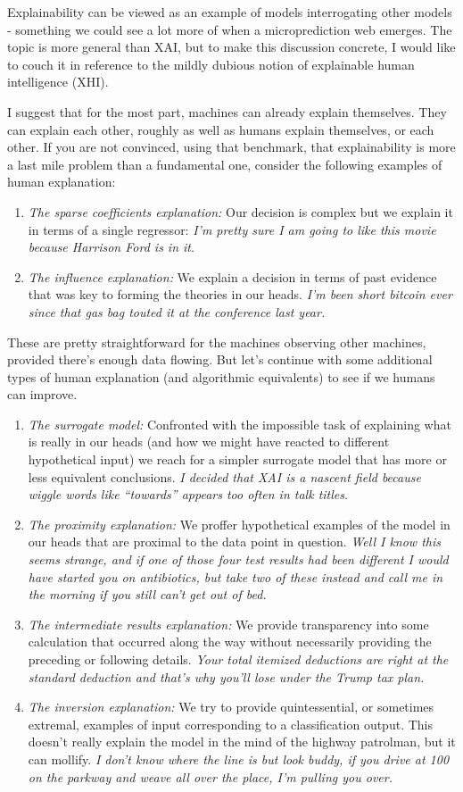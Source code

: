 Explainability can be viewed as an example of models interrogating other models - something we could see a lot more of when a microprediction web emerges. The topic is more general than XAI, but to make this discussion concrete, I would like to couch it in reference to the mildly dubious notion of explainable human intelligence (XHI). 

I suggest that for the most part, machines can already explain themselves. They can explain each other, roughly as well as humans explain themselves, or each other. If you are not convinced, using that benchmark, that explainability is more a last mile problem than a fundamental one, consider the following examples of human explanation:
\begin{enumerate}
\item {\em The sparse coefficients explanation:} Our decision is complex but we explain it in terms of a single regressor: {\em I'm pretty sure I am going to like this movie because Harrison Ford is in it}.
\item {\em The influence explanation:} We explain a decision in terms of past evidence that was key to forming the theories in our heads. {\em I'm been short bitcoin ever since that gas bag touted it at the conference last year.} 
\end{enumerate}
These are pretty straightforward for the machines observing other machines, provided there's enough data flowing. But let's continue with some additional types of human explanation (and algorithmic equivalents) to see if we humans can improve. 
\begin{enumerate}
\item {\em The surrogate model:} Confronted with the impossible task of explaining what is really in our heads (and how we might have reacted to different hypothetical input) we reach for a simpler surrogate model that has more or less equivalent conclusions. {\em I decided that XAI is a nascent field because wiggle words like ``towards'' appears too often in talk titles}. 
\item {\em The proximity explanation:} We proffer hypothetical examples of the model in our heads that are proximal to the data point in question. {\em Well I know this seems strange, and if one of those four test results had been different I would have started you on antibiotics, but take two of these instead and call me in the morning if you still can't get out of bed.} 
\item {\em The intermediate results explanation:} We provide transparency into some calculation that occurred along the way without necessarily providing the preceding or following details. {\em Your total itemized deductions are right at the standard deduction and that's why you'll lose under the Trump tax plan.}
\item {\em The inversion explanation:} We try to provide quintessential, or sometimes extremal, examples of input corresponding to a classification output. This doesn't really explain the model in the mind of the highway patrolman, but it can mollify. {\em I don't know where the line is but look buddy, if you drive at 100 on the parkway and weave all over the place, I'm pulling you over.} 
\end{enumerate} 

